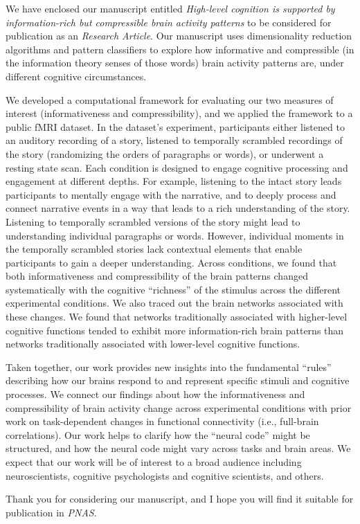 \documentclass[10pt,stdletter,orderfromtodate,sigleft]{newlfm}
\newcommand{\journal}{PNAS}
\newcommand{\articletype}{Research Article}
\newcommand{\myTitle}{High-level cognition is supported by information-rich but compressible brain activity patterns}
\begin{document}
\begin{newlfm}

  We have enclosed our manuscript entitled \textit{\myTitle} to be considered
  for publication as an \textit{\articletype}. Our manuscript uses
  dimensionality reduction algorithms and pattern classifiers to explore how
  informative and compressible (in the information theory senses of those
  words) brain activity patterns are, under different cognitive circumstances.

  We developed a computational framework for evaluating our two measures of
  interest (informativeness and compressibility), and we applied the framework
  to a public fMRI dataset. In the dataset's experiment, participants either
  listened to an auditory recording of a story, listened to temporally
  scrambled recordings of the story (randomizing the orders of paragraphs or
  words), or underwent a resting state scan. Each condition is designed to
  engage cognitive processing and engagement at different depths. For example,
  listening to the intact story leads participants to mentally engage with the
  narrative, and to deeply process and connect narrative events in a way that
  leads to a rich understanding of the story. Listening to temporally scrambled
  versions of the story might lead to understanding individual paragraphs or
  words. However, individual moments in the temporally scrambled stories lack
  contextual elements that enable participants to gain a deeper understanding.
  Across conditions, we found that both informativeness and compressibility of
  the brain patterns changed systematically with the cognitive ``richness'' of
  the stimulus across the different experimental conditions. We also traced out
  the brain networks associated with these changes. We found that networks
  traditionally associated with higher-level cognitive functions tended to
  exhibit more information-rich brain patterns than networks traditionally
  associated with lower-level cognitive functions.

  Taken together, our work provides new insights into the fundamental ``rules''
  describing how our brains respond to and represent specific stimuli and
  cognitive processes. We connect our findings about how the informativeness
  and compressibility of brain activity change across experimental conditions
  with prior work on task-dependent changes in functional connectivity (i.e.,
  full-brain correlations). Our work helps to clarify how the ``neural code''
  might be structured, and how the neural code might vary across tasks and
  brain areas. We expect that our work will be of interest to a broad audience
  including neuroscientists, cognitive psychologists and cognitive scientists,
  and others.


Thank you for considering our manuscript, and I hope you will find it suitable
for publication in \textit{\journal}.


\end{newlfm}
\end{document}
